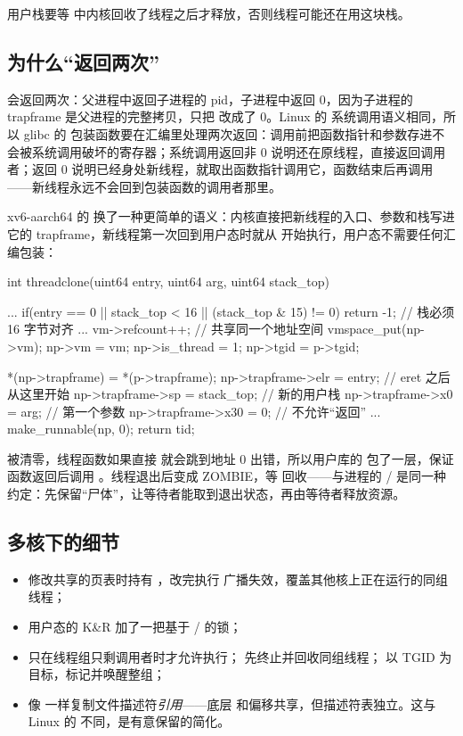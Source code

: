 用户栈要等  中内核回收了线程之后才释放，否则线程可能还在用这块栈。

\subsection{ 为什么“返回两次”}

 会返回两次：父进程中返回子进程的 pid，子进程中返回 0，因为子进程的 trapframe 是父进程的完整拷贝，只把  改成了 0。Linux 的  系统调用语义相同，所以 glibc 的  包装函数要在汇编里处理两次返回：调用前把函数指针和参数存进不会被系统调用破坏的寄存器；系统调用返回非 0 说明还在原线程，直接返回调用者；返回 0 说明已经身处新线程，就取出函数指针调用它，函数结束后再调用 ——新线程永远不会回到包装函数的调用者那里。

xv6-aarch64 的  换了一种更简单的语义：内核直接把新线程的入口、参数和栈写进它的 trapframe，新线程第一次回到用户态时就从  开始执行，用户态不需要任何汇编包装：

\begin{ccode}
int threadclone(uint64 entry, uint64 arg, uint64 stack_top)
{
  ...
  if(entry == 0 || stack_top < 16 || (stack_top & 15) != 0)
    return -1;                          // 栈必须 16 字节对齐
  ...
  vm->refcount++;                       // 共享同一个地址空间
  vmspace_put(np->vm);
  np->vm = vm;
  np->is_thread = 1;
  np->tgid = p->tgid;

  *(np->trapframe) = *(p->trapframe);
  np->trapframe->elr = entry;           // eret 之后从这里开始
  np->trapframe->sp  = stack_top;       // 新的用户栈
  np->trapframe->x0  = arg;             // 第一个参数
  np->trapframe->x30 = 0;               // 不允许“返回”
  ...
  make_runnable(np, 0);
  return tid;
}
\end{ccode}

 被清零，线程函数如果直接  就会跳到地址 0 出错，所以用户库的  包了一层，保证函数返回后调用 。线程退出后变成 ZOMBIE，等  回收——与进程的 / 是同一种约定：先保留“尸体”，让等待者能取到退出状态，再由等待者释放资源。

\subsection{多核下的细节}

\begin{itemize}
  \item {} 修改共享的页表时持有 ，改完执行  广播失效，覆盖其他核上正在运行的同组线程；
  \item 用户态的 K\&R  加了一把基于 / 的锁；
  \item {} 只在线程组只剩调用者时才允许执行； 先终止并回收同组线程； 以 TGID 为目标，标记并唤醒整组；
  \item {} 像  一样复制文件描述符\emph{引用}——底层  和偏移共享，但描述符表独立。这与 Linux 的  不同，是有意保留的简化。
\end{itemize}

